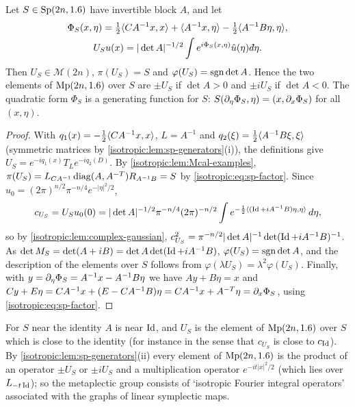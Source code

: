 \begin{proposition}\label{isotropic:prop:mp-fio}
Let $S\in\mathrm{Sp}(2n,1.6)$ have invertible block $A$, and let
\begin{equation}\label{isotropic:eq:generating-function}
\begin{gathered}
  \Phi_S(x,\eta)=\tfrac12\pair{CA^{-1}x}{x}+\pair{A^{-1}x}{\eta}-\tfrac12\pair{A^{-1}B\eta}{\eta},\\
  U_Su(x)=|\det A|^{-1/2}\int e^{i\Phi_S(x,\eta)}\hat u(\eta)\,\dbar\eta .
\end{gathered}
\end{equation}
Then $U_S\in\mathcal M(2n)$, $\pi(U_S)=S$ and $\varphi(U_S)=\operatorname{sgn}\det A$. Hence
the two elements of $\mathrm{Mp}(2n,1.6)$ over $S$ are $\pm U_S$ if $\det A>0$ and
$\pm iU_S$ if $\det A<0$. The quadratic form $\Phi_S$ is a generating function
for $S$: $S(\partial_\eta\Phi_S,\eta)=(x,\partial_x\Phi_S)$ for all $(x,\eta)$.
\end{proposition}
\begin{proof}
With $q_1(x)=-\frac12\langle CA^{-1}x, x\rangle$, $L=A^{-1}$ and
$q_2(\xi)=\frac12\langle A^{-1}B\xi, \xi\rangle$ (symmetric matrices by
\cref{isotropic:lem:sp-generators}(i)), the definitions give
$U_S=e^{-iq_1(x)}T_Le^{-iq_2(D)}$. By \cref{isotropic:lem:Mcal-examples},
$\pi(U_S)=L_{CA^{-1}}\operatorname{diag}(A,A^{-T})R_{A^{-1}B}=S$ by
\eqref{isotropic:eq:sp-factor}. Since $\hat u_0=(2\pi)^{n/2}\pi^{-n/4}e^{-|\eta|^2/2}$,
\begin{equation*}
  c_{U_S}=U_Su_0(0)=|\det A|^{-1/2}\pi^{-n/4}(2\pi)^{-n/2}\int e^{-\frac12\langle (\operatorname{Id}+iA^{-1}B)\eta, \eta\rangle}\,d\eta,
\end{equation*}
so by \cref{isotropic:lem:complex-gaussian},
$c_{U_S}^2=\pi^{-n/2}|\det A|^{-1}\det(\operatorname{Id}+iA^{-1}B)^{-1}$. As
$\det M_S=\det(A+iB)=\det A\det(\operatorname{Id}+iA^{-1}B)$, $\varphi(U_S)=\operatorname{sgn}\det A$, and the
description of the elements over $S$ follows from
$\varphi(\lambda U_S)=\lambda^2\varphi(U_S)$. Finally, with
$y=\partial_\eta\Phi_S=A^{-1}x-A^{-1}B\eta$ we have $Ay+B\eta=x$ and
$Cy+E\eta=CA^{-1}x+(E-CA^{-1}B)\eta=CA^{-1}x+A^{-T}\eta=\partial_x\Phi_S$, using
\eqref{isotropic:eq:sp-factor}.
\end{proof}

For $S$ near the identity $A$ is near $\operatorname{Id}$, and $U_S$ is the element of
$\mathrm{Mp}(2n,1.6)$ over $S$ which is close to the identity (for instance in
the sense that $c_{U_S}$ is close to $c_{\operatorname{Id}}$). By
\cref{isotropic:lem:sp-generators}(ii) every element of $\mathrm{Mp}(2n,1.6)$ is
the product of an operator $\pm U_S$ or $\pm iU_S$ and a multiplication
operator $e^{-it|x|^2/2}$ (which lies over $L_{-t\operatorname{Id}}$); so the metaplectic group consists of `isotropic Fourier
integral operators' associated with the graphs of linear symplectic maps.

